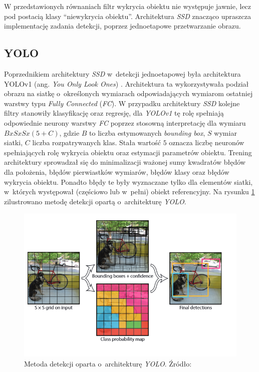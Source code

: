 W przedstawionych równaniach filtr wykrycia obiektu nie występuje jawnie, lecz pod postacią klasy ``niewykrycia obiektu''. 
Architektura \emph{SSD} znacząco upraszcza implementację zadania detekcji, poprzez jednoetapowe przetwarzanie obrazu. 


\subsection{YOLO}
\label{ch:yolo}
Poprzednikiem architektury \emph{SSD} w~detekcji jednoetapowej była architektura YOLOv1 (ang. \emph{You Only Look Ones}) \cite{yolov1}.
Architektura ta wykorzystywała podział obrazu na siatkę o~określonych wymiarach odpowiadających wymiarom ostatniej warstwy typu \emph{Fully Connected} (\emph{FC}).
W przypadku architektury \emph{SSD} kolejne filtry stanowiły klasyfikację oraz regresję, 
dla \emph{YOLOv1} tę rolę spełniają odpowiednie neurony warstwy \emph{FC} poprzez stosowną interpretację dla wymiaru $BxSxSx(5+C)$, gdzie $B$ to liczba estymowanych \emph{bounding box}, $S$ wymiar siatki, $C$ liczba rozpatrywanych klas. 
Stała wartość $5$ oznacza liczbę neuronów spełniających rolę wykrycia obiektu oraz estymacji parametrów obiektu.
Trening architektury sprowadzał się do minimalizacji ważonej sumy kwadratów błędów dla położenia, błędów pierwiastków wymiarów, błędów klasy oraz błędów wykrycia obiektu. 
Ponadto błędy te były wyznaczane tylko dla elementów siatki, w~których występował (częściowo lub w~pełni) obiekt referencyjny.
Na rysunku \ref{fig:yolo_img} zilustrowano metodę detekcji opartą o~architekturę \emph{YOLO}.

\begin{figure}
    \centering
    \includegraphics[width=0.9\linewidth]{images/yolo.png}
    \caption{Metoda detekcji oparta o~architekturę \emph{YOLO}. Źródło: \cite{yolov1}}
    \label{fig:yolo_img}
\end{figure}

